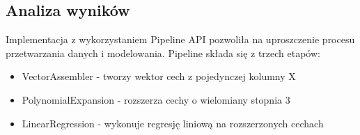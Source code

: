 \documentclass{article}
\begin{document}
\subsection{Analiza wyników}
Implementacja z wykorzystaniem Pipeline API pozwoliła na uproszczenie procesu przetwarzania danych i modelowania. Pipeline składa się z trzech etapów:
\begin{itemize}
    \item VectorAssembler - tworzy wektor cech z pojedynczej kolumny X
    \item PolynomialExpansion - rozszerza cechy o wielomiany stopnia 3
    \item LinearRegression - wykonuje regresję liniową na rozszerzonych cechach
\end{itemize}
\end{document}

